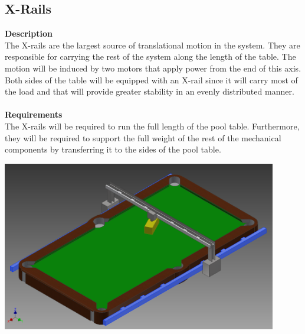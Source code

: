 \documentclass[titlepage]{article}
\begin{document}
\subsection{X-Rails}
\textbf{Description}\\
The X-rails are the largest source of translational motion in the system. They are responsible for carrying the rest of the system along the length of the table. The motion will be induced by two motors that apply power from the end of this axis. Both sides of the table will be equipped with an X-rail since it will carry most of the load and that will provide greater stability in an evenly distributed manner.\\\\
\textbf{Requirements}\\
The X-rails will be required to run the full length of the pool table. Furthermore, they will be required to support the full weight of the rest of the mechanical components by transferring it to the sides of the pool table.
\begin{center}
	\includegraphics[width = 0.9\textwidth]{xRails1.png}
\label{fig:xRailFig}
\end{center}

\newpage
\end{document}
